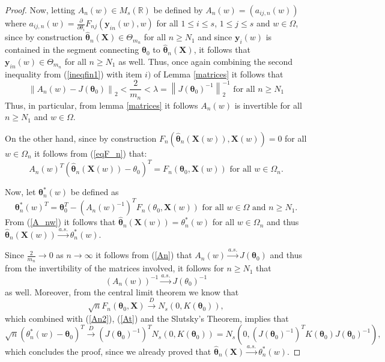\documentclass[10pt,a4paper,onecolumn]{article} %
\newcommand{\bs}{\boldsymbol}
\begin{document}
\begin{appendix}
\begin{proof}
Now, letting $A_n(w)\in M_s(\mathbb{R})$ be defined by $A_n(w)=(a_{ij,n}(w))$ where $a_{ij,n}(w)=\frac{\partial}{\partial \theta_i}F_{nj}(\bs{y}_{in}(w),w)$ for all $1\leq i\leq s$, $1\leq j\leq s$ and $w\in \Omega$, since by construction $\hat{\bs{\theta}}_n(\bs{X})\in \Theta_{m_n}$ for all $n\geq N_1$ and since $\bs{y}_i(w)$ is contained in the segment connecting $\bs{\theta}_0$ to $\bs{\hat{\theta}}_n(\bs{X})$, it follows that $\bs{y}_{in}(w)\in \Theta_{m_n}$ for all $n\geq N_1$ as well. Thus, once again combining the second inequality from (\ref{ineqfin1}) with item $i)$ of Lemma \ref{matrices} it follows that
\begin{equation}\label{An}
\left\| A_n(w)-J(\bs{\theta}_0)\right\|_2< \frac{2}{m_n}<\lambda=\left\|J(\bs{\theta}_0)^{-1}\right\|_2^{-1}\mbox{ for all }n\geq N_1
\end{equation}
Thus, in particular, from lemma \ref{matrices} it follows $A_n(w)$ is invertible for all $n\geq N_1$ and $w\in \Omega$.

On the other hand, since by construction $F_{n}(\bs{\hat{\theta}}_n(\bs{X}(w)),\bs{X}(w))=0$ for all $w\in \Omega_n$ it follows from (\ref{eqF_n}) that:
\begin{equation}\label{A_nw}  A_n(w)^T (\hat{\bs{\theta}}_{n}(\bs{X}(w)) - \theta_{0})^T = F_{n}(\bs{\theta}_0,\bs{X}(w))\mbox{ for all }w\in \Omega_n.
\end{equation}

Now, let $\bs{\theta}^*_n(w)$ be defined as
\begin{equation}\label{At}  \bs{\theta}_n^*(w)^T =\bs{\theta}_0^T - (A_n(w)^{-1})^T  F_n(\theta_0,\bs{X}(w))\mbox{ for all }w\in\Omega\mbox{ and }n\geq N_1.
\end{equation}
From (\ref{A_nw}) it follows that $\hat{\bs{\theta}}_n(\bs{X}(w))=\theta_n^*(w)$ for all $w\in \Omega_n$ and thus $\hat{\bs{\theta}}_n(\bs{X}(w)) \overset{a.s.}{\to} \theta_n^*(w)$.

Since $\frac{2}{m_n}\to 0$ as $n\to \infty$ it follows from (\ref{An}) that $A_n(w)\overset{a.s.}{\to} J(\bs{\theta}_0)$ and thus from the invertibility of the matrices involved, it follows for $n\geq N_1$ that
\begin{equation}\label{An2}(A_n(w))^{-1}\overset{a.s.}{\to} J(\theta_0)^{-1}
\end{equation}
as well. Moreover, from the central limit theorem we know that
\begin{equation}\label{An2}\sqrt{n}F_n(\bs{\theta}_0,\bs{X})\overset{D}{\to} N_s(0,K(\bs{\theta}_0)),
\end{equation}
which combined with (\ref{An2}), (\ref{At}) and the Slutsky's Theorem, implies that
\begin{equation*}\sqrt{n}(\theta_n^*(w)-\bs{\theta}_0)^T \overset{D}{\to} (J(\bs{\theta}_0)^{-1})^T N_s(0,K(\bs{\theta}_0))=N_s\left(0,(J(\bs{\theta}_0)^{-1})^TK(\bs{\theta}_0)J(\bs{\theta}_0)^{-1}\right),
\end{equation*}
which concludes the proof, since we already proved that $\hat{\bs{\theta}}_n(\bs{X}) \overset{a.s.}{\to} \theta_n^*(w)$.
\end{proof}


\end{appendix}
\end{document}
